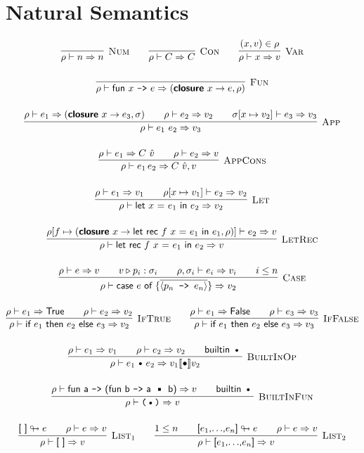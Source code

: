 \documentclass{article}
\def\code#1{\textsf{#1}}
\def\rt{\Rightarrow}
\def\binop{\, \text{\textbullet}\, }
\def\envj#1#2#3{#1 \vdash #2 \rt #3}
\def\closure#1#2#3{(\textsf{\textbf{closure}} \ #1 \to #2,#3)}
\def\tsc#1{\textsc{#1}}
\begin{document}
\section*{Natural Semantics}

\begin{gather*}
\infer[\tsc{Num}]{\envj \rho n n}{}\qquad
\infer[\tsc{Con}]{\envj \rho C C}{}\qquad
\infer[\tsc{Var}]{\envj \rho x v}{(x,v)\in \rho}\\[12pt]
\infer[\tsc{Fun}]{\envj \rho {\code{fun $x$ \texttt{->} $e$}} {\closure x e \rho}}{}\\[12pt]
\infer[\tsc{App}]{\envj \rho {e_1 \ e_2} v_3}{\envj{\rho}{e_1}{\closure x {e_3} {\sigma}} && \envj \rho {e_2} {v_2} && \envj{\sigma [x\mapsto v_2]}{e_3}{v_3}}\\[12pt]
\infer[\tsc{AppCons}]{\envj{\rho}{e_1\, e_2}{C\ \hat{v},v}}{\envj{\rho}{e_1}{C\ \hat{v}} && \envj{\rho}{e_2}{v}}\\[12pt]
\infer[\tsc{Let}]{\envj \rho {\code{let $x$ = $e_1$ in $e_2$}} {v_2}}{\envj \rho {e_1} {v_1} && \envj {\rho[x\mapsto v_1]} {e_2} {v_2}}\\[12pt]
\infer[\tsc{LetRec}]{\envj \rho {\code{let rec $f$ $x$ = $e_1$ in $e_2$}} {v}}{\envj{\rho[f \mapsto \closure x {\code{let rec $f$ $x$ = $e_1$ in $e_1$}}{\rho}]}{e_2}{v}}\\[12pt]
\infer[\tsc{Case}]{\envj \rho {\code{case $e$ of \{$\overline{\langle p_n \texttt{ -> } e_n\rangle}$\}}} {v_2}}{\envj \rho {e} {v} && v\triangleright p_i : \sigma_i && \envj {\rho,\sigma_i}{e_i}{v_i} && i \leq n}\\[12pt]
\infer[\tsc{IfTrue}]{\envj \rho {\code{if $e_1$ then $e_2$ else $e_3$}} {v_2}}{\envj \rho {e_1} {\code{True}} && \envj \rho {e_2} {v_2}}\qquad
\infer[\tsc{IfFalse}]{\envj \rho {\code{if $e_1$ then $e_2$ else $e_3$}} {v_3}}{\envj \rho {e_1} {\code{False}} && \envj \rho {e_3} {v_3}}
\\[12pt]
\infer[\tsc{BuiltInOp}]{\envj \rho {e_1 \binop e_2} {v_1\llbracket\bullet \rrbracket v_2}}{\envj \rho {e_1} {v_1} && \envj {\rho} {e_2} {v_2} && \textsf{builtin}\, \binop}\\[12pt]
\infer[\tsc{BuiltInFun}]{\envj \rho {\texttt{($\binop$)}} {v}}{\envj \rho {\code{fun a \texttt{->} (fun b \texttt{->} a $\binop$ b)}} {v} && \textsf{builtin}\, \binop}\\[12pt]
\infer[\tsc{List}_1]{\envj \rho {\code{[ ]}} {v}}{\code{[ ]}\looparrowright e && \envj \rho e v}\qquad 
\infer[\tsc{List}_2]{\envj \rho {\code{[$e_1$,$\ldots$,$e_n$]}} {v}}{1 \leq n && \code{[$e_1$,$\ldots$,$e_n$]}\looparrowright e && \envj \rho e v}
\end{gather*}
\end{document}

